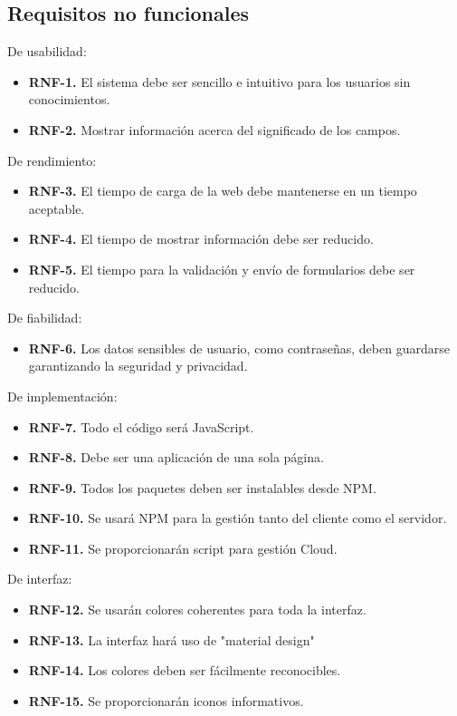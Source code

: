 \subsection{Requisitos no funcionales}

  De usabilidad:
\begin{itemize}
  \item \textbf{RNF-1.} El sistema debe ser sencillo e intuitivo para los usuarios sin conocimientos. 
  \item \textbf{RNF-2.} Mostrar información acerca del significado de los campos.
\end{itemize}
 De rendimiento:
\begin{itemize}
  \item \textbf{RNF-3.} El tiempo de carga de la web debe mantenerse en un tiempo aceptable.
  \item \textbf{RNF-4.} El tiempo de mostrar información debe ser reducido.
  \item \textbf{RNF-5.} El tiempo para la validación y envío de formularios debe ser reducido.
\end{itemize}
 De fiabilidad:
\begin{itemize}
  \item \textbf{RNF-6.} Los datos sensibles de usuario, como contraseñas, deben guardarse garantizando la seguridad y privacidad.
\end{itemize}
 De implementación: 
\begin{itemize}
  \item \textbf{RNF-7.} Todo el código será JavaScript.
  \item \textbf{RNF-8.} Debe ser una aplicación de una sola página.
  \item \textbf{RNF-9.} Todos los paquetes deben ser instalables desde NPM.
  \item \textbf{RNF-10.} Se usará NPM para la gestión tanto del cliente como el servidor.
  \item \textbf{RNF-11.} Se proporcionarán script para gestión Cloud.
\end{itemize}
De interfaz:
\begin{itemize}
  \item \textbf{RNF-12.} Se usarán colores coherentes para toda la interfaz.
  \item \textbf{RNF-13.} La interfaz hará uso de "material design"
  \item \textbf{RNF-14.} Los colores deben ser fácilmente reconocibles.
  \item \textbf{RNF-15.} Se proporcionarán iconos informativos.
\end{itemize}

